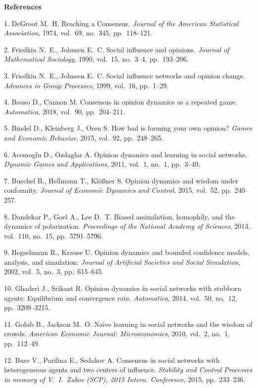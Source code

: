 
{\small

\vskip6mm

\noindent \textbf{References} }

\vskip 2mm

{\footnotesize

1. DeGroot M.~H. Reaching a Consensus. \emph{Journal of the
American Statistical Association}, 1974, vol.~69, no.~345,
pp.~118--121.

2. Friedkin N.~E., Johnsen E.~C. Social influence and opinions.
\emph{Journal of Mathematical Sociology}, 1990, vol.~15, no.~3--4,
pp.~193--206.

3. Friedkin N.~E., Johnsen E.~C. Social influence networks and
opinion change. \emph{Advances in Group Processes}, 1999, vol.~16,
pp.~1--29.

4. Bauso D., Cannon M. Consensus in opinion dynamics as a repeated
game. \emph{Automatica}, 2018, vol.~90, pp.~204--211.

5. Bindel D., Kleinberg J., Oren S. How bad is forming your own
opinion? \emph{Games and Eco\-no\-mic Behavior}, 2015, vol.~92,
pp.~248--265.

6. Acemoglu D., Ozdaglar A. Opinion dynamics and learning in
social networks. \emph{Dynamic Games and Applications}, 2011,
vol.~1, no.~1, pp.~3--49.

7. Buechel B., Hellmann T., Kl{\"o}{\ss}ner S. Opinion dynamics
and wisdom under conformity. \emph{Journal of Economic Dynamics
and Control}, 2015, vol.~52, pp.~240--257.

8. Dandekar P., Goel A., Lee D.~T. Biased assimilation, homophily,
and the dynamics of polarization. \emph{Proceedings of the
National Academy of Sciences}, 2013, vol.~110, no.~15,
pp.~5791--5796.

9. Hegselmann R., Krause U. Opinion dynamics and bounded
confidence models, analysis, and simulation. \emph{Journal of
Artificial Societies and Social Simulation}, 2002, vol.~5, no.~3,
pp.~615--645.

10. Ghaderi J., Srikant R. Opinion dynamics in social networks
with stubborn agents: Equilibrium and convergence rate.
\emph{Automatica}, 2014, vol.~50, no.~12, pp.~3209--3215.

11. Golub B., Jackson M.~O. Naive learning in social networks and
the wisdom of crowds.     \emph{American Economic Journal:
Microeconomics}, 2010, vol.~{2}, no.~{1}, pp.~{112--49}.

12. Bure V., Parilina E., Sedakov A. Consensus in social networks
with heterogeneous agents and two centers of influence.
\emph{Stability and Control Processes in memory of V.~I.~Zubov
(SCP), 2015 Intern. Conference}, 2015, pp.~233--236.

}
